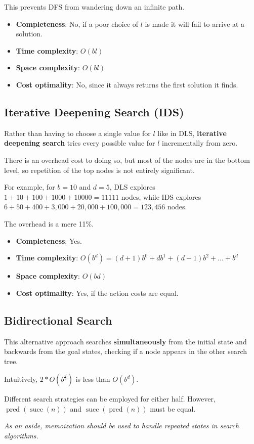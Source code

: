 This prevents DFS from wandering down an infinite path.

\begin{itemize}
    \item \textbf{Completeness}: No, if a poor choice of $l$ is made it will fail to arrive at a solution.
    \item \textbf{Time complexity}: $O(bl)$
    \item \textbf{Space complexity}: $O(bl)$
    \item \textbf{Cost optimality}: No, since it always returns the first solution it finds.
\end{itemize}


\subsection{Iterative Deepening Search (IDS)}

Rather than having to choose a single value for $l$ like in DLS, \textbf{iterative deepening search} tries every possible value for $l$ incrementally from zero.

There is an overhead cost to doing so, but most of the nodes are in the bottom level, so repetition of the top nodes is not entirely significant.

For example, for $b = 10$ and $d = 5$, DLS explores $1 + 10 + 100 + 1000 + 10000 = 11111$ nodes, while IDS explores $6 + 50 + 400 + 3,000 + 20,000 + 100,000 = 123,456$ nodes.

The overhead is a mere 11\%.

\begin{itemize}
    \item \textbf{Completeness}: Yes.
    \item \textbf{Time complexity}: $O(b^d) = (d+1)b^0 + db^1 + (d-1)b^2 + ... + b^d$
    \item \textbf{Space complexity}: $O(bd)$
    \item \textbf{Cost optimality}:  Yes, if the action costs are equal.
\end{itemize}


\subsection{Bidirectional Search}

This alternative approach searches \textbf{simultaneously} from the initial state and backwards from the goal states, checking if a node appears in the other search tree.

Intuitively, $2 * O(b^{\frac{d}{2}})$ is less than $O(b^d)$.

Different search strategies can be employed for either half. However, $\operatorname{pred}(\operatorname{succ}(n))$ and $\operatorname{succ}(\operatorname{pred}(n))$ must be equal.

\emph{As an aside, memoization should be used to handle repeated states in search algorithms.}